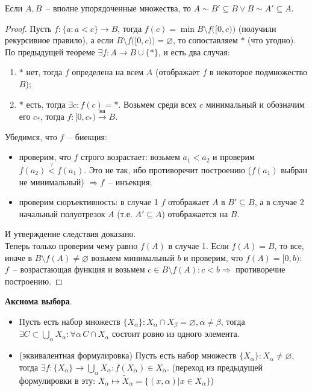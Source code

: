 \begin{cor}
	Если $A, B$~-- вполне упорядоченные множества, то $A \sim B' \subseteq B \lor B \sim A' \subseteq A$.
\end{cor}
\begin{proof}
	Пусть $f: \{a: a<c\} \to B$, тогда $f(c) = \min{B \setminus f\big( [0,c) \big)}$ (получили рекурсивное правило), а если $B \setminus f\big( [0,c) \big) = \varnothing$, то сопоставляем $*$ (что угодно). По предыдущей теореме $\exists f: A \to B \cup \{*\}$, и есть два случая:
	\begin{enumerate}
		\item $*$ нет, тогда $f$ определена на всем $A$ (отображает $f$ в некоторое подмножество $B$);
		\item $*$ есть, тогда $\exists c: f(c) = *$. Возьмем среди всех $c$ минимальный и обозначим его $c_*$, тогда $f: [0, c_*) \stackrel{на}{\longrightarrow} B$.
	\end{enumerate}
	Убедимся, что $f$~-- биекция:
	\begin{itemize}
		\item проверим, что $f$ строго возрастает: возьмем $a_1 < a_2$ и проверим $f(a_2) \overset{?}{<} f(a_1)$. Это не так, ибо противоречит построению ($f(a_1)$ выбран не минимальный) $\Rightarrow f$~-- инъекция;
		\item проверим сюръективность: в случае 1 $f$ отображает $A$ в $B' \subseteq B$, а в случае 2 начальный полуотрезок $A$ (т.е. $A' \subseteq A$) отображается на $B$.
	\end{itemize}
	И утверждение следствия доказано.\\
	Теперь только проверим чему равно $f(A)$ в случае 1. Если $f(A)=B$, то все, иначе в $B \setminus f(A) \neq \varnothing$ возьмем минимальный $b$ и проверим, что $f(A) = [0,b)$: $f$~-- возрастающая функция и возьмем $c \in B \setminus f(A): c < b \Rightarrow$ противоречие построению.\pagebreak
\end{proof}

\textbf{Аксиома выбора}.
\begin{itemize}
	\item Пусть есть набор множеств $\{X_\alpha\}: X_\alpha \cap X_\beta = \varnothing, \alpha \neq \beta$, тогда $\exists C \subset \underset{\alpha}{\bigcup} X_\alpha: \forall \alpha\, C \cap X_\alpha$ состоит ровно из одного элемента.
	\item (эквивалентная формулировка) Пусть есть набор множеств $\{X_\alpha\}: X_\alpha \neq \varnothing$, тогда $\exists f: \{X_\alpha\} \to \underset{\alpha}{\bigcup} X_\alpha: f(X_\alpha) \in X_\alpha$. (переход из предыдущей формулировки в эту: $X_\alpha \mapsto \tilde{X}_\alpha = \{(x,\alpha) | x \in X_\alpha\}$)
\end{itemize}

